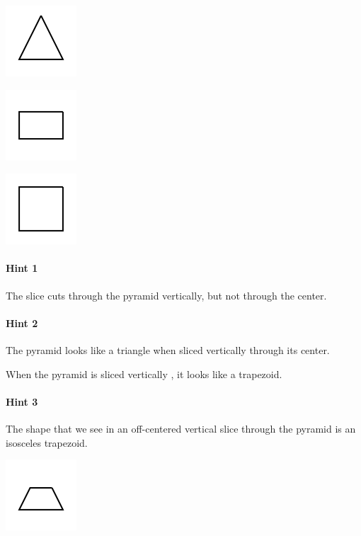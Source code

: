 \documentclass[twocolumn,10pt]{article}
\def\shrinkfactor{0.4}
\begin{document}
 
\includegraphics[scale=\shrinkfactor]{figures/d443e0deb4dc18ef30fbf9139d310266f460b66b.png}


\includegraphics[scale=\shrinkfactor]{figures/0e5042b475e0847d67b74c0482f8e8173f798656.png}


\includegraphics[scale=\shrinkfactor]{figures/4b59a0ece6acc7c19c389e1de534d1df93bf1169.png}



\paragraph{Hint 1}The slice cuts through the pyramid vertically, but not through the center.

\paragraph{Hint 2}The pyramid looks like a triangle when sliced vertically through its center.

When the pyramid is sliced vertically \DIFdelbegin {}\DIFdelend \DIFaddbegin {}\DIFaddend , it looks like a trapezoid.

\paragraph{Hint 3}The shape that we see in an off-centered vertical slice through the pyramid is an isosceles trapezoid.  

\includegraphics[scale=\shrinkfactor]{figures/462dbf19e63d9954ed7a531f7ea0e2b0379d9bb9.png}
\end{document}
